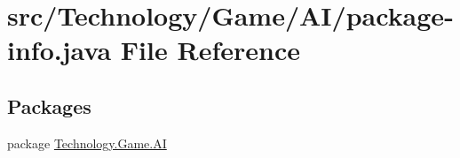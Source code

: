 \hypertarget{_technology_2_game_2_a_i_2package-info_8java}{\section{src/\-Technology/\-Game/\-A\-I/package-\/info.java File Reference}
\label{_technology_2_game_2_a_i_2package-info_8java}
}
\subsection*{Packages}
\begin{DoxyCompactItemize}
\item 
package \hyperlink{namespace_technology_1_1_game_1_1_a_i}{Technology.\-Game.\-A\-I}
\end{DoxyCompactItemize}
